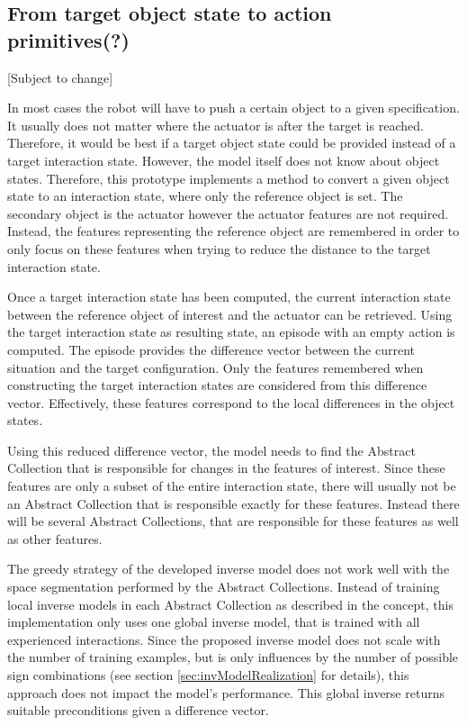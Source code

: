 \subsection{From target object state to action primitives(?)\label{sec:pairPlanningReal}} %

[Subject to change] %

In most cases the robot will have to push a certain object to a given specification. It usually does not matter where the actuator is after the target is reached. Therefore, it would be best if a target object state could be provided instead of a target interaction state. However, the model itself does not know about object states. Therefore, this prototype implements a method to convert a given object state to an interaction state, where only the reference object is set. The secondary object is the actuator however the actuator features are not required. Instead, the features representing the reference object are remembered in order to only focus on these features when trying to reduce the distance to the target interaction state. 

Once a target interaction state has been computed, the current interaction state between the reference object of interest and the actuator can be retrieved. Using the target interaction state as resulting state, an episode with an empty action is computed. The episode provides the difference vector between the current situation and the target configuration. Only the features remembered when constructing the target interaction states are considered from this difference vector. Effectively, these features correspond to the local differences in the object states. 

Using this reduced difference vector, the model needs to find the Abstract Collection that is responsible for changes in the features of interest. Since these features are only a subset of the entire interaction state, there will usually not be an Abstract Collection that is responsible exactly for these features. Instead there will be several Abstract Collections, that are responsible for these features as well as other features. 

The greedy strategy of the developed inverse model does not work well with the space segmentation performed by the Abstract Collections.  
Instead of training local inverse models in each Abstract Collection as described in the concept, this implementation only uses one global inverse model, that is trained with all experienced interactions. 
Since the proposed inverse model does not scale with the number of training examples, but is only influences by the number of possible sign combinations (see section \ref{sec:invModelRealization} for details), this approach does not impact the model's performance.
This global inverse returns suitable preconditions given a difference vector.

